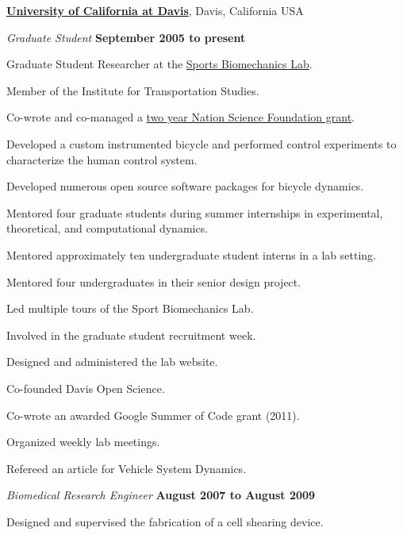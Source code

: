 \documentclass[10pt]{article}
\newenvironment{outerlist}[1][\enskip\textbullet]%
        {\begin{itemize}[#1]}{\end{itemize}%
         \vspace{-.6\baselineskip}}
\newenvironment{innerlist}[1][\enskip\textbullet]%
        {\begin{compactitem}[#1]}{\end{compactitem}}
\begin{document}
\href{http://www.ucdavis.edu}{\textbf{University of California at Davis}}, Davis, California USA
\begin{outerlist}
  \item[] \textit{Graduate Student}%
        \hfill \textbf{September 2005 to present}
  \begin{innerlist}
    \item Graduate Student Researcher at the
      \href{http://biosport.ucdavis.edu}{Sports Biomechanics Lab}.
    \item Member of the Institute for Transportation Studies.
    \item Co-wrote and co-managed a
        \href{http://biosport.ucdavis.edu/research-projects/bicycle}{two year
        Nation Science Foundation grant}.
    \item Developed a custom instrumented bicycle and performed control
        experiments to characterize the human control system.
    \item Developed numerous open source software packages for bicycle
        dynamics.
    \item Mentored four graduate students during summer internships in
      experimental, theoretical, and computational dynamics.
    \item Mentored approximately ten undergraduate student interns in a lab
      setting.
    \item Mentored four undergraduates in their senior design project.
    \item Led multiple tours of the Sport Biomechanics Lab.
    \item Involved in the graduate student recruitment week.
    \item Designed and administered the lab website.
    \item Co-founded Davis Open Science.
    \item Co-wrote an awarded Google Summer of Code grant (2011).
    \item Organized weekly lab meetings.
    \item Refereed an article for Vehicle System Dynamics.
  \end{innerlist}
  \item[] \textit{Biomedical Research Engineer}%
        \hfill \textbf{August 2007 to August 2009}
  \begin{innerlist}
    \item Designed and supervised the fabrication of a cell shearing device.
  \end{innerlist}

\end{outerlist}
\end{document}
